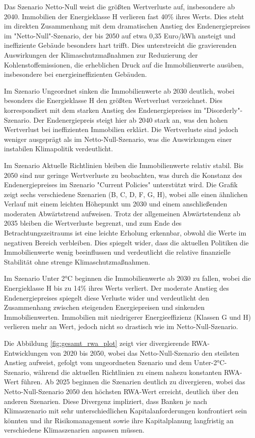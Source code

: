 Das Szenario Netto-Null weist die größten Wertverluste auf, insbesondere ab 2040. Immobilien der Energieklasse H verlieren fast 40\% ihres Werts. Dies steht im direkten Zusammenhang mit dem dramatischen Anstieg des Endenergiepreises im "Netto-Null"-Szenario, der bis 2050 auf etwa 0,35 Euro/kWh ansteigt und ineffiziente Gebäude besonders hart trifft. Dies unterstreicht die gravierenden Auswirkungen der Klimaschutzmaßnahmen zur Reduzierung der Kohlenstoffemissionen, die erheblichen Druck auf die Immobilienwerte ausüben, insbesondere bei energieineffizienten Gebäuden.

Im Szenario Ungeordnet sinken die Immobilienwerte ab 2030 deutlich, wobei besonders die Energieklasse H den größten Wertverlust verzeichnet. Dies korrespondiert mit dem starken Anstieg des Endenergiepreises im "Disorderly"-Szenario. Der Endenergiepreis steigt hier ab 2040 stark an, was den hohen Wertverlust bei ineffizienten Immobilien erklärt. Die Wertverluste sind jedoch weniger ausgeprägt als im Netto-Null-Szenario, was die Auswirkungen einer instabilen Klimapolitik verdeutlicht.

Im Szenario Aktuelle Richtlinien bleiben die Immobilienwerte relativ stabil. Bis 2050 sind nur geringe Wertverluste zu beobachten, was durch die Konstanz des Endenergiepreises im Szenario "Current Policies" unterstützt wird. Die Grafik zeigt sechs verschiedene Szenarien (B, C, D, F, G, H), wobei alle einen ähnlichen Verlauf mit einem leichten Höhepunkt um 2030 und einem anschließenden moderaten Abwärtstrend aufweisen. Trotz der allgemeinen Abwärtstendenz ab 2035 bleiben die Wertverluste begrenzt, und zum Ende des Betrachtungszeitraums ist eine leichte Erholung erkennbar, obwohl die Werte im negativen Bereich verbleiben. Dies spiegelt wider, dass die aktuellen Politiken die Immobilienwerte wenig beeinflussen und verdeutlicht die relative finanzielle Stabilität ohne strenge Klimaschutzmaßnahmen.

Im Szenario Unter 2°C beginnen die Immobilienwerte ab 2030 zu fallen, wobei die Energieklasse H bis zu 14\% ihres Werts verliert. Der moderate Anstieg des Endenergiepreises spiegelt diese Verluste wider und verdeutlicht den Zusammenhang zwischen steigenden Energiepreisen und sinkenden Immobilienwerten. Immobilien mit niedrigerer Energieeffizienz (Klassen G und H) verlieren mehr an Wert, jedoch nicht so drastisch wie im Netto-Null-Szenario.


Die Abbildung \ref{fig:gesamt_rwa_plot} zeigt vier divergierende \acs{RWA}-Entwicklungen von 2020 bis 2050, wobei das Netto-Null-Szenario den steilsten Anstieg aufweist, gefolgt vom ungeordneten Szenario und dem Unter-2°C-Szenario, während die aktuellen Richtlinien zu einem nahezu konstanten \acs{RWA}-Wert führen. Ab 2025 beginnen die Szenarien deutlich zu divergieren, wobei das Netto-Null-Szenario 2050 den höchsten \acs{RWA}-Wert erreicht, deutlich über den anderen Szenarien. Diese Divergenz impliziert, dass Banken je nach Klimaszenario mit sehr unterschiedlichen Kapitalanforderungen konfrontiert sein könnten und ihr Risikomanagement sowie ihre Kapitalplanung langfristig an verschiedene Klimaszenarien anpassen müssen.